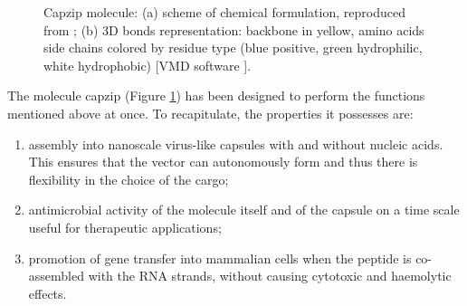 \begin{figure}
\begin{center}
 \hspace{0.5cm}
\caption[Cazip molecule]{Capzip molecule: (a) scheme of chemical formulation, reproduced from \citet{Castelletto2016}; (b) 3D bonds representation: backbone in yellow, amino acids side chains colored by residue type (blue positive, green hydrophilic, white hydrophobic) [VMD software \citet{HUMP96}].} \label{fig:capzip}
\end{center}
\end{figure}

The molecule capzip \citep{Castelletto2016} (Figure \ref{fig:capzip}) has been designed to perform the functions mentioned above at once. To recapitulate, the properties it possesses are:
\begin{enumerate}
\item assembly into nanoscale virus-like capsules with and without nucleic acids. This ensures that the vector can autonomously form and thus there is flexibility in the choice of the cargo;
\item antimicrobial activity of the molecule itself and of the capsule on a time scale useful for therapeutic applications;
\item promotion of gene transfer into mammalian cells when the peptide is co-assembled with the RNA strands, without causing cytotoxic and haemolytic effects.
\end{enumerate}


